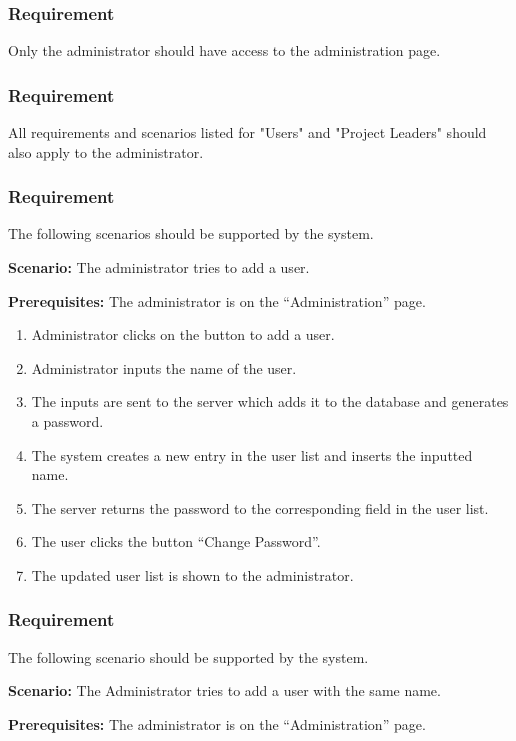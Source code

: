 \documentclass{article}
\begin{document}
\subsubsection{Requirement}
Only the administrator should have access to the administration page.

\subsubsection{Requirement}
All requirements and scenarios listed for "Users" and "Project Leaders" should also apply to the administrator.

\subsubsection{Requirement}
The following scenarios should be supported by the system.

\textbf{Scenario:} The administrator tries to add a user.

\textbf{Prerequisites:} The administrator is on the “Administration” page.

\begin{enumerate}
    \item Administrator clicks on the button to add a user.
    \item Administrator inputs the name of the user.
    \item The inputs are sent to the server which adds it to the database and generates a password.
    \item The system creates a new entry in the user list and inserts the inputted name.
    \item The server returns the password to the corresponding field in the user list.
    \item The user clicks the button “Change Password”.
    \item The updated user list is shown to the administrator.
\end{enumerate}

\subsubsection{Requirement}
The following scenario should be supported by the system.

\textbf{Scenario:} The Administrator tries to add a user with the same name.

\textbf{Prerequisites:} The administrator is on the “Administration” page.
\end{document}
